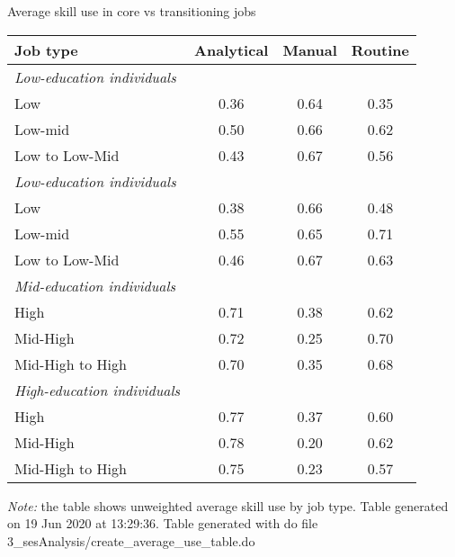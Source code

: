 \begin{center}
\begin{threeparttable}[!h]
\caption{Average skill use in core vs transitioning jobs}
\begin{tabular}{lccc}
\toprule
\toprule
\textbf{Job type}&\multicolumn{1}{c}{\textbf{Analytical}}&\multicolumn{1}{c}{\textbf{Manual}}&\multicolumn{1}{c}{\textbf{Routine}} \\
\midrule
\textit{Low-education individuals} \\
\hline
\hspace{3mm}Low&0.36&0.64&0.35 \\
\hspace{3mm}Low-mid&0.50&0.66&0.62 \\
\hspace{3mm}Low to Low-Mid&0.43&0.67&0.56 \\
\textit{Low-education individuals} \\
\hline
\hspace{3mm}Low&0.38&0.66&0.48 \\
\hspace{3mm}Low-mid&0.55&0.65&0.71 \\
\hspace{3mm}Low to Low-Mid&0.46&0.67&0.63 \\
\midrule\textit{Mid-education individuals} \\
\hline
\hspace{3mm}High&0.71&0.38&0.62 \\
\hspace{3mm}Mid-High&0.72&0.25&0.70 \\
\hspace{3mm}Mid-High to High&0.70&0.35&0.68 \\
\textit{High-education individuals} \\
\hline
\hspace{3mm}High&0.77&0.37&0.60 \\
\hspace{3mm}Mid-High&0.78&0.20&0.62 \\
\hspace{3mm}Mid-High to High&0.75&0.23&0.57 \\
\bottomrule
\bottomrule
\end{tabular}
\begin{tablenotes}
\item \footnotesize \textit{Note:} the table shows unweighted average skill use by job type. Table generated on 19 Jun 2020 at 13:29:36. Table generated with do file 3\_sesAnalysis/create\_average\_use\_table.do
\end{tablenotes}
\end{threeparttable}
\end{center}
